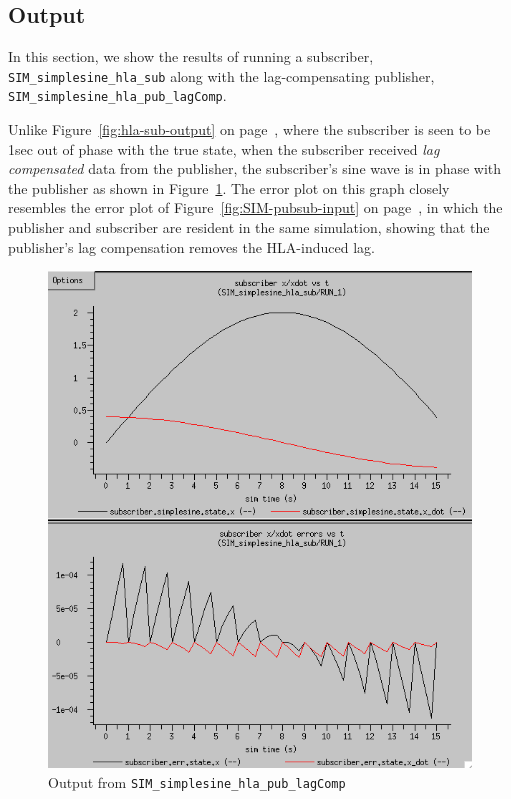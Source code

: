 \subsection{Output}

In this section,
we show the results of running a subscriber,
{\tt SIM\_simplesine\_hla\_sub}
along with the lag-compensating
publisher,
{\tt SIM\_simplesine\_hla\_pub\_lagComp}.

Unlike Figure~\ref{fig:hla-sub-output} on page~\pageref{fig:hla-sub-output},
where the subscriber is seen to be 1sec out of phase with the true state,
when the subscriber received {\em lag compensated} data from the publisher,
the subscriber's sine wave is in phase with the publisher
as shown in Figure~\ref{fig:hla-pub-lagComp-output}.
The error plot on this graph closely resembles the error plot of
Figure~\ref{fig:SIM-pubsub-input} on page~\pageref{fig:SIM-pubsub-input},
in which the publisher and subscriber are resident
in the same simulation, showing that the publisher's lag compensation
removes the HLA-induced lag.

\begin{figure}[h]
  \begin{center}
    \includegraphics[width=4.5in]{TrickHLAUser-SIM-hla-pub-lagComp.png}
  \end{center}
\caption{Output from {\tt SIM\_simplesine\_hla\_pub\_lagComp}}
\label{fig:hla-pub-lagComp-output}
\end{figure}

